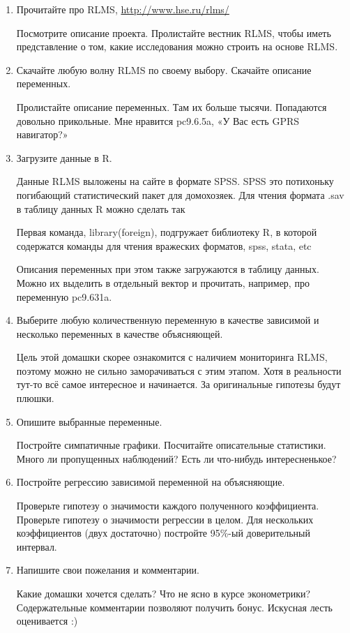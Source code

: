 \documentclass[12pt, a4paper]{article}\usepackage[]{graphicx}\usepackage[]{color}
\begin{document}
\begin{enumerate}
\item Прочитайте про RLMS, \url{http://www.hse.ru/rlms/}

Посмотрите описание проекта. Пролистайте вестник RLMS, чтобы иметь представление о том, какие исследования можно строить на основе RLMS.

\item Скачайте любую волну RLMS по своему выбору. Скачайте описание переменных.

Пролистайте описание переменных. Там их больше тысячи. Попадаются довольно прикольные. Мне нравится pc9.6.5a, «У Вас есть GPRS навигатор?»

\item Загрузите данные в R.

Данные RLMS выложены на сайте в формате SPSS. SPSS это потихоньку погибающий статистический пакет для домохозяек. Для чтения формата .sav в таблицу данных R можно сделать так

Первая команда, library(foreign), подгружает библиотеку R, в которой содержатся команды для чтения вражеских форматов, spss, stata, etc

Описания переменных при этом также загружаются в таблицу данных. Можно их выделить в отдельный вектор и прочитать, например, про переменную pc9.631a.


\item Выберите любую количественную переменную в качестве зависимой и несколько переменных в качестве объясняющей.

Цель этой домашки скорее ознакомится с наличием мониторинга RLMS, поэтому можно не сильно заморачиваться с этим этапом. Хотя в реальности тут-то всё самое интересное и начинается. За оригинальные гипотезы будут плюшки.

\item Опишите выбранные переменные.

Постройте симпатичные графики. Посчитайте описательные статистики. Много ли пропущенных наблюдений? Есть ли что-нибудь интересненькое?

\item Постройте регрессию зависимой переменной на объясняющие.

Проверьте гипотезу о значимости каждого полученного коэффициента. Проверьте гипотезу о значимости регрессии в целом. Для нескольких коэффициентов (двух достаточно) постройте 95\%-ый доверительный интервал.

\item Напишите свои пожелания и комментарии.

Какие домашки хочется сделать? Что не ясно в курсе эконометрики? Содержательные комментарии позволяют получить бонус. Искусная лесть оценивается :)

\end{enumerate}
\end{document}
